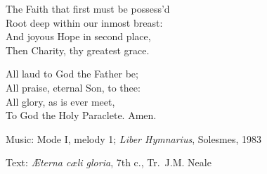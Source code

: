 \hymn



\begin{underhymnverse}
The Faith that first must be possess'd\\
Root deep within our inmost breast:\\
And joyous Hope in second place,\\
Then Charity, thy greatest grace.

All laud to God the Father be;\\
All praise, eternal Son, to thee:\\
All glory, as is ever meet,\\
To God the Holy Paraclete. Amen.
\end{underhymnverse}

\begin{hymnsource}
Music: Mode I, melody 1; \emph{Liber Hymnarius}, Solesmes, 1983

Text: \emph{Æterna cæli gloria}, 7th c., Tr.\ J.M. Neale
\end{hymnsource}
